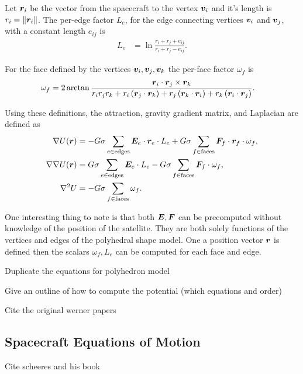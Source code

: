 \documentclass[]{aiaa-tc}%
\begin{document}
Let \( \bm{r}_i \) be the vector from the spacecraft to the vertex \( \bm{v}_i \) and it's length is \( r_i = \left\| \bm{r}_i \right\| \).
The per-edge factor \( L_e \), for the edge connecting vertices \( \bm{v}_i \) and \( \bm{v}_j \), with a constant length \( e_{ij} \) is 
\begin{align*}
	L_e &= \ln \frac{r_i + r_j + e_{ij}}{r_i + r_j - e_{ij}}.
\end{align*}

For the face defined by the vertices \( \bm{v}_i, \bm{v}_j, \bm{v}_k \) the per-face factor \( \omega_f \) is
\begin{align*}
	\omega_f &= 2 \arctan \frac{\bm{r}_i \cdot \bm{r}_j \times \bm{r}_k}{r_i r_j r_k + r_i \left( \bm{r}_j \cdot \bm{r}_k \right) + r_j \left( \bm{r}_k \cdot \bm{r}_i \right) + r_k \left( \bm{r}_i \cdot \bm{r}_j \right)} .
\end{align*}

Using these definitions, the attraction, gravity gradient matrix, and Laplacian are defined as
\begin{align*}
	\nabla U ( \bm{r} ) &= -G \sigma \sum_{e \in \text{edges}} \bm{E}_e \cdot \bm{r}_e \cdot L_e + G \sigma \sum_{f \in \text{faces}} \bm{F}_f \cdot \bm{r}_f \cdot \omega_f ,\\
	\nabla \nabla U ( \bm{r} ) &= G \sigma \sum_{e \in \text{edges}} \bm{E}_e  \cdot L_e - G \sigma \sum_{f \in \text{faces}} \bm{F}_f \cdot \omega_f , \\
	\nabla^2 U &= -G \sigma \sum_{f \in \text{faces}}  \omega_f .
\end{align*}

One interesting thing to note is that both \( \bm{E}, \bm{F} \) can be precomputed without knowledge of the position of the satellite. 
They are both solely functions of the vertices and edges of the polyhedral shape model.
One a position vector \( \bm{r} \) is defined then the scalars \( \omega_f, L_e \) can be computed for each face and edge. 


Duplicate the equations for polyhedron model

Give an outline of how to compute the potential (which equations and order)

Cite the original werner papers

\subsection{Spacecraft Equations of Motion}
Cite scheeres and his book
\end{document}
